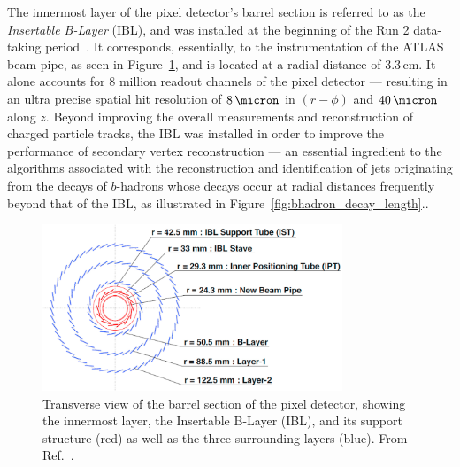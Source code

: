 The innermost layer of the pixel detector's barrel section is referred to as the
\textit{Insertable B-Layer} (IBL), and was installed at the beginning of the Run 2
data-taking period~\cite{Capeans:1291633}.
It corresponds, essentially, to the instrumentation of the ATLAS beam-pipe, as seen in Figure~\ref{fig:pixel_detector_trans},
and is located at a radial distance of 3.3\,cm.
It alone accounts for 8 million readout channels of
the pixel detector --- resulting in an ultra precise spatial hit resolution of $8\,\micron$ in $(r-\phi)$ and
$40\,\micron$ along $z$.
Beyond improving the overall measurements and reconstruction of charged particle tracks,
the IBL was installed in order to improve the performance of secondary vertex
reconstruction --- an essential ingredient to the algorithms associated with
the reconstruction and identification of jets originating from the decays
of $b$-hadrons whose decays occur at radial distances frequently beyond that
of the IBL, as illustrated in Figure~\ref{fig:bhadron_decay_length}..

\begin{figure}[!htb]
    \begin{center}
        \includegraphics[width=0.8\textwidth]{figures/chapter2/inner_detector/pixel_detector_trans}
        \caption{
            Transverse view of the barrel section of the pixel detector, showing
            the innermost layer, the Insertable B-Layer (IBL), and its support structure (red) as well as the
            three surrounding layers (blue). From Ref.~\cite{Backhaus:2016ctq}.
        }
        \label{fig:pixel_detector_trans}
    \end{center}
\end{figure}

